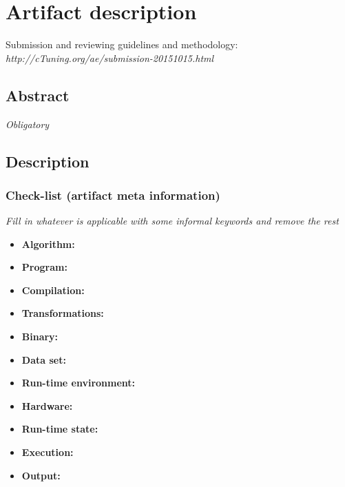 \documentclass{sigplanconf}
\begin{document}


\appendix
\section{Artifact description}

Submission and reviewing guidelines and methodology: \\
{\em http://cTuning.org/ae/submission-20151015.html}

\subsection{Abstract}

{\em Obligatory}

\subsection{Description}

\subsubsection{Check-list (artifact meta information)}

{\em Fill in whatever is applicable with some informal keywords and remove the rest}

{\small
\begin{itemize}
  \item {\bf Algorithm: }
  \item {\bf Program: }
  \item {\bf Compilation: }
  \item {\bf Transformations: }
  \item {\bf Binary: }
  \item {\bf Data set: }
  \item {\bf Run-time environment: }
  \item {\bf Hardware: }
  \item {\bf Run-time state: }
  \item {\bf Execution: }
  \item {\bf Output: }
\end{itemize}
}
\end{document}
